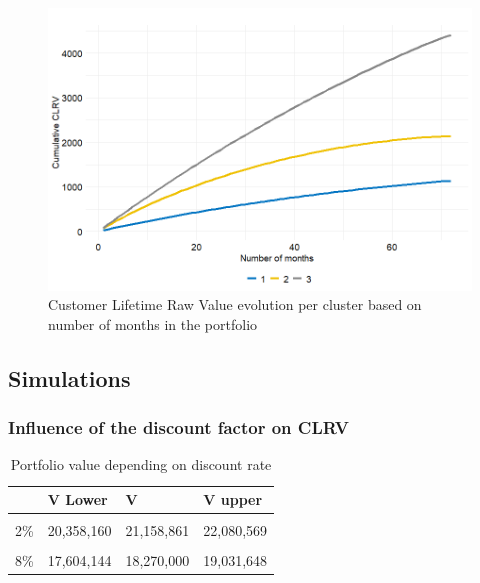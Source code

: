 \documentclass[
]{book}
\begin{document}
\begin{figure}

{\centering \includegraphics[width=12.5in]{./imgs/clrv_evolution_per_cluster} 

}

\caption{Customer Lifetime Raw Value evolution per cluster based on number of months in the portfolio}\label{fig:clrvEvolutionClust}
\end{figure}

\hypertarget{simulations}{%
\subsection{Simulations}\label{simulations}}

\hypertarget{influence-of-the-discount-factor-on-clrv}{%
\subsubsection*{Influence of the discount factor on CLRV}\label{influence-of-the-discount-factor-on-clrv}}

\begin{table}[H]

\caption{\label{tab:portValDiscountTab}Portfolio value depending on discount rate}
\centering
\begin{tabular}[t]{llll}
\toprule
  & V Lower & V & V upper\\
\midrule
\cellcolor{gray!6}{1\%} & \cellcolor{gray!6}{20,894,006} & \cellcolor{gray!6}{21,721,297} & \cellcolor{gray!6}{22,674,662}\\
2\% & 20,358,160 & 21,158,861 & 22,080,569\\
\cellcolor{gray!6}{4\%} & \cellcolor{gray!6}{19,357,495} & \cellcolor{gray!6}{20,108,832} & \cellcolor{gray!6}{20,971,852}\\
8\% & 17,604,144 & 18,270,000 & 19,031,648\\
\bottomrule
\end{tabular}
\end{table}
\end{document}
